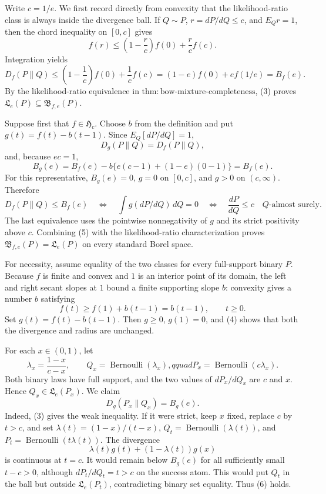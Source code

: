 Write \(c=1/e\).  We first record directly from convexity that the likelihood-ratio class is always inside the divergence ball.  If \(Q\sim P\), \(r=dP/dQ\le c\), and \(E_Qr=1\), then the chord inequality on \([0,c]\) gives
\[
 f(r)\le \left(1-\frac r c\right)f(0)+\frac r c f(c).
\]
Integration yields
\[
 D_f(P\|Q)\le \left(1-\frac1c\right)f(0)+\frac1c f(c)
 =(1-e)f(0)+ef(1/e)=B_f(e). \tag{3}
\]
By the likelihood-ratio equivalence in \(\mathrm{thm:bow\text{-}mixture\text{-}completeness}\), (3) proves \(\mathfrak L_e(P)\subseteq\mathfrak B_{f,e}(P)\).

Suppose first that \(f\in\mathfrak H_c\).  Choose \(b\) from the definition and put \(g(t)=f(t)-b(t-1)\).  Since \(E_Q[dP/dQ]=1\),
\[
 D_g(P\|Q)=D_f(P\|Q),
\]
and, because \(ec=1\),
\[
 B_g(e)=B_f(e)-b\{e(c-1)+(1-e)(0-1)\}=B_f(e). \tag{4}
\]
For this representative, \(B_g(e)=0\), \(g=0\) on \([0,c]\), and \(g>0\) on \((c,\infty)\).  Therefore
\[
 D_f(P\|Q)\le B_f(e)
 \quad\Longleftrightarrow\quad
 \int g(dP/dQ)\,dQ=0
 \quad\Longleftrightarrow\quad
 \frac{dP}{dQ}\le c\quad Q\text{-almost surely}. \tag{5}
\]
The last equivalence uses the pointwise nonnegativity of \(g\) and its strict positivity above \(c\).  Combining (5) with the likelihood-ratio characterization proves \(\mathfrak B_{f,e}(P)=\mathfrak L_e(P)\) on every standard Borel space.

For necessity, assume equality of the two classes for every full-support binary \(P\).  Because \(f\) is finite and convex and \(1\) is an interior point of its domain, the left and right secant slopes at \(1\) bound a finite supporting slope \(b\): convexity gives a number \(b\) satisfying
\[
 f(t)\ge f(1)+b(t-1)=b(t-1),\qquad t\ge0.
\]
Set \(g(t)=f(t)-b(t-1)\).  Then \(g\ge0\), \(g(1)=0\), and (4) shows that both the divergence and radius are unchanged.

For each \(x\in(0,1)\), let
\[
 \lambda_x=\frac{1-x}{c-x},\qquad
 Q_x=\operatorname{Bernoulli}(\lambda_x),qquad
 P_x=\operatorname{Bernoulli}(c\lambda_x).
\]
Both binary laws have full support, and the two values of \(dP_x/dQ_x\) are \(c\) and \(x\).  Hence \(Q_x\in\mathfrak L_e(P_x)\).  We claim
\[
 D_g(P_x\|Q_x)=B_g(e). \tag{6}
\]
Indeed, (3) gives the weak inequality.  If it were strict, keep \(x\) fixed, replace \(c\) by \(t>c\), and set \(\lambda(t)=(1-x)/(t-x)\), \(Q_t=\operatorname{Bernoulli}(\lambda(t))\), and \(P_t=\operatorname{Bernoulli}(t\lambda(t))\).  The divergence
\[
 \lambda(t)g(t)+(1-\lambda(t))g(x)
\]
is continuous at \(t=c\).  It would remain below \(B_g(e)\) for all sufficiently small \(t-c>0\), although \(dP_t/dQ_t=t>c\) on the success atom.  This would put \(Q_t\) in the ball but outside \(\mathfrak L_e(P_t)\), contradicting binary set equality.  Thus (6) holds.


